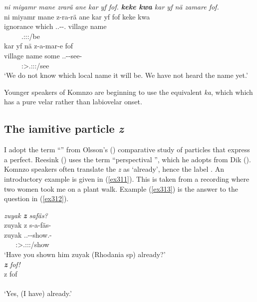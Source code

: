 \begin{exe}
	\ex \emph{ni miyamr mane zrarä ane kar yf fof. \textbf{keke kwa} kar yf nä zamare fof.}\\
	\glll ni miyamr mane z-ra-rä ane kar yf fof keke kwa\\
	{\Fnsg} ignorance which \Tsg.\F.\Bet-\Irr-\Cop.{\Ndu} {\Dem} village name {\Emph} {\Neg} {\Fut}\\
	~ ~ ~ {\footnotesize \Tsg.\F:\Sbj:\Irr:\Ipfv/be} ~ ~ ~ ~ ~ ~\\
	\sn
	\glll kar yf nä z-a-mar-e fof\\
	village name some \Tsg.\F.\Gam-\Ndu-see-{\Fnsg} {\Emph}\\
	~ ~ ~ {\footnotesize \Fpl:\Sbj>\Tsg.\F:\Obj:\Rpst:\Pfv/see} ~\\
	\trans `We do not know which local name it will be. We have not heard the name yet.' 
	\label{ex367}
\end{exe}

Younger speakers of Komnzo are beginning to use the  equivalent \emph{ka}, which which has a pure velar rather than labiovelar onset.

\subsection{The iamitive particle \emph{z}}\label{iamitivez}

I adopt the term ``'' from Olsson's (\citeyear{Olsson:2013vn}) comparative study of particles that express a perfect. Reesink (\citeyear[184]{Reesink:2009bird}) uses the term ``perspectival '', which he adopts from Dik (\citeyear{Dik:1997uj}). Komnzo speakers often translate the   \emph{z} as `already', hence the  label {\Iam}. An introductory example is given in (\ref{ex311}). This is taken from a recording where two women took me on a plant walk. Example (\ref{ex313}) is the answer to the question in (\ref{ex312}).

\begin{exe}
\ex \label{ex311}
\begin{xlist}
	\ex \emph{zuyak \textbf{z} safäs?}\\
	\glll zuyak z s-a-fäs-\Zero{}\\
	zuyak {\Iam} \Tsg.\Masc.\Gam-\Ndu-show.\Rs-\Stsg{}\\
	~ ~ {\footnotesize \Stsg:\Sbj>\Tsg.\Masc:\Obj:\Nonpast:\Pfv/show}\\
	\trans `Have you shown him zuyak (Rhodania sp) already?'\\ 
	\label{ex312}
	\ex \emph{\textbf{z} fof!}\\
	\gll z fof\\
	{\Iam} {\Emph}\\
	\trans `Yes, (I have) already.' 
	\label{ex313}
\end{xlist}
\end{exe}

